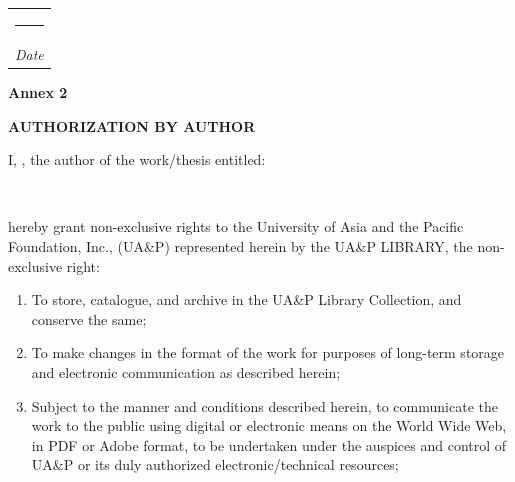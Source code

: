 {\vspace{0.5in}
\hspace*{\fill}\begin{tabular}[t]{@{}c@{}}
\rule{2.7in}{0.4pt}\\
{\itshape Date}
\end{tabular}

\clearpage
{}
{}
\uapletterhead
\noindent\textbf{Annex 2}

\vspace{0.1in}
\begin{center}
\textbf{AUTHORIZATION BY AUTHOR}
\end{center}

\vspace{0.1in}
\noindent I, \underline{}, the author of the work/thesis entitled:

\vspace{4pt}
\noindent\underline{}\\[4pt]
\noindent\underline{}

\vspace{4pt}
\noindent hereby grant non-exclusive rights to the University of Asia and the Pacific Foundation, Inc., (UA\&P) represented herein by the UA\&P LIBRARY, the non-exclusive right:

\begingroup
\setlength{\leftmargini}{0.5in}\setlength{\topsep}{2pt}\setlength{\itemsep}{2pt}\setlength{\parsep}{0pt}
\begin{enumerate}
\item To store, catalogue, and archive in the UA\&P Library Collection, and conserve the same;
\item To make changes in the format of the work for purposes of long-term storage and electronic communication as described herein;
\item Subject to the manner and conditions described herein, to communicate the work to the public using digital or electronic means on the World Wide Web, in PDF or Adobe format, to be undertaken under the auspices and control of UA\&P or its duly authorized electronic/technical resources;
\end{enumerate}

}
